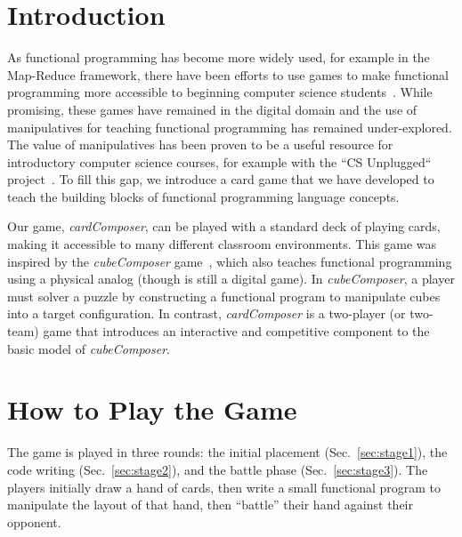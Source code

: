 \documentclass[sigconf]{acmart}
\begin{document}
\section{Introduction}

As functional programming has become more widely used, for example in the Map-Reduce framework, there have been efforts to use games to make functional programming more accessible to beginning computer science students~\cite{almeida2018teaching,morazan2013functional}. 
While promising, these games have remained in the digital domain and the use of manipulatives for teaching functional programming has remained under-explored.
The value of manipulatives has been proven to be a useful resource for introductory computer science courses, for example with the ``CS Unplugged`` project~\cite{csunplugged}.
To fill this gap, we introduce a card game that we have developed to teach the building blocks of  functional programming language concepts. 

Our game, \textit{cardComposer}, can be played with a standard deck of playing cards, making it accessible to many different classroom environments.
This game was inspired by the \textit{cubeComposer} game~\cite{cubeComposer}, which also teaches functional programming using a physical analog (though is still a digital game).
In \textit{cubeComposer}, a player must solver a puzzle by constructing a functional program to manipulate cubes into a target configuration.
In contrast, \textit{cardComposer} is a two-player (or two-team) game that introduces an interactive and competitive component to the basic model of \textit{cubeComposer}.




\section{How to Play the Game}
The game is played in three rounds: the initial placement (Sec.~\ref{sec:stage1}), the code writing (Sec.~\ref{sec:stage2}), and the battle phase (Sec.~\ref{sec:stage3}).
The players initially draw a hand of cards, then write a small functional program to manipulate the layout of that hand, then ``battle'' their hand against their opponent.
\end{document}
